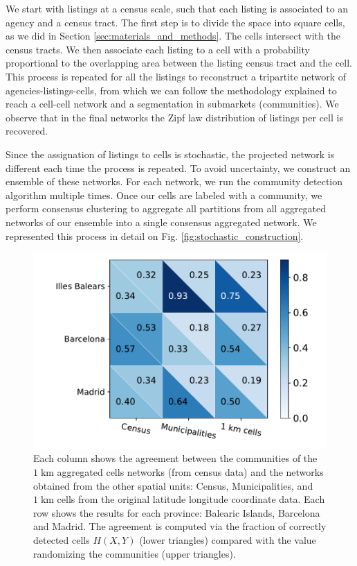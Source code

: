 We start with listings at a census scale, such that each listing is associated to an agency and a census tract. The first step is to divide the space into square cells, as we did in Section \ref{sec:materials_and_methods}. The cells intersect with the census tracts. We then associate each listing to a cell with a probability proportional to the overlapping area between the listing census tract and the cell. This process is repeated for all the listings to reconstruct a tripartite network of agencies-listings-cells, from which we can follow the methodology explained to reach a cell-cell network and a segmentation in submarkets (communities). 
We observe that in the final networks the Zipf law distribution of listings per cell is recovered.

Since the assignation of listings to cells is stochastic, the projected network is different each time the process is repeated. To avoid uncertainty, we construct an ensemble of these networks. For each network, we run the community detection algorithm multiple times. Once our cells are labeled with a community, we perform consensus clustering to aggregate all partitions from all aggregated networks of our ensemble into a single consensus aggregated network. We represented this process in detail on Fig. \ref{fig:stochastic_construction}.

\begin{figure}
    \label{fig:network_sector_distribution}
    \centering
    \includegraphics[width = \textwidth]{Figs/Idealista_segmentation/Cells1000_agreement_AggCells.pdf}
	\caption[Comparison between the communities from aggregated cells network and other spatial units.]{ Each column shows the agreement between the communities of the $1 \; \textrm{km}$ aggregated cells networks (from census data) and the networks obtained from the other spatial units: Census, Municipalities, and $1 \; \textrm{km}$ cells from the original latitude longitude coordinate data. Each row shows the results for each province: Balearic Islands, Barcelona and Madrid. The agreement is computed via the fraction of correctly detected cells $H(X,Y)$ (lower triangles) compared with the value randomizing the communities (upper triangles).}
\end{figure}

